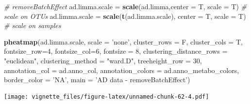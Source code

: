 \documentclass[]{book}
\newenvironment{Shaded}{\begin{snugshade}}{\end{snugshade}}
\newcommand{\KeywordTok}[1]{\textcolor[rgb]{0.13,0.29,0.53}{\textbf{#1}}}
\newcommand{\DataTypeTok}[1]{\textcolor[rgb]{0.13,0.29,0.53}{#1}}
\newcommand{\DecValTok}[1]{\textcolor[rgb]{0.00,0.00,0.81}{#1}}
\newcommand{\StringTok}[1]{\textcolor[rgb]{0.31,0.60,0.02}{#1}}
\newcommand{\CommentTok}[1]{\textcolor[rgb]{0.56,0.35,0.01}{\textit{#1}}}
\newcommand{\NormalTok}[1]{#1}
\begin{document}
\begin{Shaded}
\begin{Highlighting}[]
\CommentTok{# removeBatchEffect}
\NormalTok{ad.limma.scale =}\StringTok{ }\KeywordTok{scale}\NormalTok{(ad.limma,}\DataTypeTok{center =}\NormalTok{ T, }\DataTypeTok{scale =}\NormalTok{ T) }\CommentTok{# scale on OTUs}
\NormalTok{ad.limma.scale =}\StringTok{ }\KeywordTok{scale}\NormalTok{(}\KeywordTok{t}\NormalTok{(ad.limma.scale), }\DataTypeTok{center =}\NormalTok{ T, }\DataTypeTok{scale =}\NormalTok{ T) }\CommentTok{# scale on samples}

\KeywordTok{pheatmap}\NormalTok{(ad.limma.scale, }
         \DataTypeTok{scale =} \StringTok{'none'}\NormalTok{, }
         \DataTypeTok{cluster_rows =}\NormalTok{ F, }
         \DataTypeTok{cluster_cols =}\NormalTok{ T, }
         \DataTypeTok{fontsize_row=}\DecValTok{4}\NormalTok{, }\DataTypeTok{fontsize_col=}\DecValTok{6}\NormalTok{,}
         \DataTypeTok{fontsize =} \DecValTok{8}\NormalTok{,}
         \DataTypeTok{clustering_distance_rows =} \StringTok{"euclidean"}\NormalTok{,}
         \DataTypeTok{clustering_method =} \StringTok{"ward.D"}\NormalTok{,}
         \DataTypeTok{treeheight_row =} \DecValTok{30}\NormalTok{,}
         \DataTypeTok{annotation_col =}\NormalTok{ ad.anno_col,}
         \DataTypeTok{annotation_colors =}\NormalTok{ ad.anno_metabo_colors,}
         \DataTypeTok{border_color =} \StringTok{'NA'}\NormalTok{,}
         \DataTypeTok{main =} \StringTok{'AD data - removeBatchEffect'}\NormalTok{)}
\end{Highlighting}
\end{Shaded}

\texttt{[image: vignette\_files/figure-latex/unnamed-chunk-62-4.pdf]}
\end{document}
